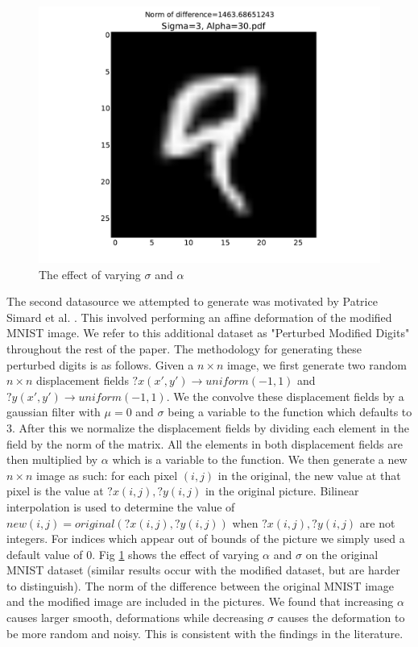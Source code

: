 \documentclass[conference]{IEEEtran}
\begin{document}
\begin{figure}[h]
	\includegraphics[scale=0.30]{Sigma=3,Alpha=30.pdf}
	\caption{The effect of varying $\sigma$ and $\alpha$}
	\label{Perturbed}
\end{figure}

The second datasource we attempted to generate was motivated by Patrice Simard et al. \cite{Simard}. This involved performing an affine deformation of the modified MNIST image. We refer to this additional dataset as "Perturbed Modified Digits" throughout the rest of the paper. The methodology for generating these perturbed digits is as follows. Given a $n\times n$ image, we first generate two random $n\times n$ displacement fields $?x(x',y')\rightarrow uniform(-1,1)$ and $?y(x',y')\rightarrow uniform(-1,1)$. We the convolve these displacement fields by a gaussian filter with $\mu = 0$ and $\sigma$ being a variable to the function which defaults to 3. After this we normalize the displacement fields by dividing each element in the field by the norm of the matrix. All the elements in both displacement fields are then multiplied by $\alpha$ which is a variable to the function. We then generate a new $n\times n$ image as such: for each pixel $(i,j)$ in the original, the new value at that pixel is the value at $?x(i,j),?y(i,j)$ in the original picture. Bilinear interpolation is used to determine the value of $new(i,j)=original(?x(i,j),?y(i,j))$ when $?x(i,j),?y(i,j)$ are not integers. For indices which appear out of bounds of the picture we simply used a default value of 0. Fig \ref{Perturbed} shows the effect of varying $\alpha$ and $\sigma$ on the original MNIST dataset (similar results occur with the modified dataset, but are harder to distinguish). The norm of the difference between the original MNIST image and the modified image are included in the pictures. We found that increasing $\alpha$ causes larger smooth, deformations while decreasing $\sigma$ causes the deformation to be more random and noisy. This is consistent with the findings in the literature.
\end{document}
